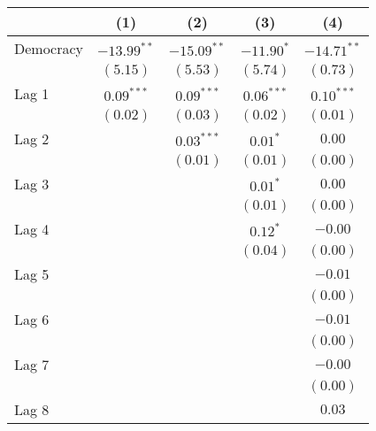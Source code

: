 
\begin{table}
\begin{center}
\begin{tabular}{l c c c c}
\hline
 & (1) & (2) & (3) & (4) \\
\hline
Democracy                       & $-13.99^{**}$ & $-15.09^{**}$ & $-11.90^{*}$ & $-14.71^{**}$ \\
                                & $(5.15)$      & $(5.53)$      & $(5.74)$     & $(0.73)$      \\
Lag 1                           & $0.09^{***}$  & $0.09^{***}$  & $0.06^{***}$ & $0.10^{***}$  \\
                                & $(0.02)$      & $(0.03)$      & $(0.02)$     & $(0.01)$      \\
Lag 2                           &               & $0.03^{***}$  & $0.01^{*}$   & $0.00$        \\
                                &               & $(0.01)$      & $(0.01)$     & $(0.00)$      \\
Lag 3                           &               &               & $0.01^{*}$   & $0.00$        \\
                                &               &               & $(0.01)$     & $(0.00)$      \\
Lag 4                           &               &               & $0.12^{*}$   & $-0.00$       \\
                                &               &               & $(0.04)$     & $(0.00)$      \\
Lag 5                           &               &               &              & $-0.01$       \\
                                &               &               &              & $(0.00)$      \\
Lag 6                           &               &               &              & $-0.01$       \\
                                &               &               &              & $(0.00)$      \\
Lag 7                           &               &               &              & $-0.00$       \\
                                &               &               &              & $(0.00)$      \\
Lag 8                           &               &               &              & $0.03$        \\

\end{tabular}
\end{center}
\end{table}
